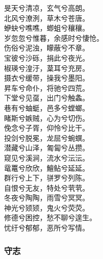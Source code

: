 \documentclass[]{article}
\begin{document}
旻天兮清凉，玄气兮高朗。\\
北风兮潦洌，草木兮苍唐。\\
蛜蚗兮噍噍，蝍蛆兮穰穰。\\
岁忽忽兮惟暮，余感时兮悽怆。\\
伤俗兮泥浊，矇蔽兮不章。\\
宝彼兮沙砾，捐此兮夜光。\\
椒瑛兮湟汙，葈耳兮充房。\\
摄衣兮缓带，操我兮墨阳。\\
昇车兮命仆，将驰兮四荒。\\
下堂兮见虿，出门兮触螽。\\
巷有兮蚰蜓，邑多兮螳螂。\\
睹斯兮嫉贼，心为兮切伤。\\
俛念兮子胥，仰怜兮比干。\\
投剑兮脱冕，龙屈兮蜿蟤。\\
潜藏兮山泽，匍匐兮丛攒。\\
窥见兮溪涧，流水兮沄沄。\\
鼋鼍兮欣欣，鱣鲇兮延延。\\
群行兮上下，骈罗兮列陈。\\
自恨兮无友，特处兮茕茕。\\
冬夜兮陶陶，雨雪兮冥冥。\\
神光兮颎颎，鬼火兮荧荧。\\
修德兮困控，愁不聊兮遑生。\\
忧纡兮郁郁，恶所兮写情。

\hypertarget{header-n3171}{%
\subsubsection{守志}\label{header-n3171}}
\end{document}
